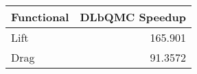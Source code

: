\begin{tabular}{lr}
\toprule
 Functional   &   DLbQMC Speedup \\
\midrule
 Lift         &         165.901  \\
 Drag         &          91.3572 \\
\bottomrule
\end{tabular}
